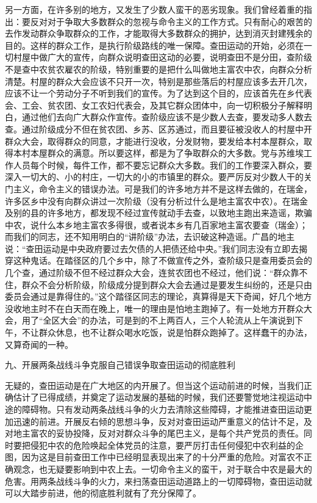 另一方面，在许多别的地方，又发生了少数人蛮干的恶劣现象。我们曾经着重的指出：要反对对于争取大多数群众的忽视与命令主义的工作方式。只有耐心的艰苦的去作发动群众争取群众的工作，才能取得大多数群众的拥护，达到消灭封建残余的目的。这样的群众工作，是执行阶级路线的唯一保障。查田运动的开始，必须在一切村屋中做广大的宣传，向群众说明查田这动的必要，说明查田不是分田，查阶级不是查中农贫农雇农的阶级，特别重要的是把什么叫做地主富农中农，向群众分析清楚。村屋的群众大会应该不只开一次，特别是那些落后的村屋应该多去开几次，应该不让一个劳动分子不听到我们的宣传。为了达到这个目的，应该首先在乡代表会、工会、贫农团、女工农妇代表会，及其它群众团体中，向一切积极分子解释明白，通过他们去向广大群众作宣传。查阶级应该不是少数人去查，要发动多人数去查。通过阶级成分不但在贫农团、乡苏、区苏通过，而且要征被没收人的村屋中开群众大会，取得群众的同意，才能进行没收，分发财物，要发给本村本屋群众，取得本村本屋群众的满意。所以要这样，都是为了争取群众的大多数。党与苏维埃工作人员每个时候，每件工作，都不要忘记群众大多数。我们的工作要深入群众，要深入一切大的、小的村庄，一切大的小的市镇里的群众。要严厉反对少数人干的关门主义，命令主义的错误办法。可是我们的许多地方并不是这样去做的，在瑞金，许多区乡中没有向群众讲过一次阶级（没有分析过什么是地主富农中农）。在瑞金及别的县的许多地方，都发现不经过宣传就动手去查，以致地主跑出来造谣，欺骗中农，说什么本乡地主富农多得很，或者说本乡有几百家地主富农要查（瑞金）；而我们的同志，还不知用明白的“讲阶级”办法，去识破这种造谣。广昌的地主说：“查田运动是中央政府要过去欠债的人把债还给中央。”我们同志没有立即去揭穿这种鬼话。在踏径区的几个乡中，除了不做宣传之外，查阶级只是查用委员会的几个查，通过阶级不但不经过群众大会，连贫农团也不经过，他们说：“群众靠不住，群众不会分析阶级，阶级成分提到群众大会去通过是要发生纠纷的，还是只由委员会通过是靠得住的。”这个踏径区同志的理论，真算得是天下奇闻，好几个地方没收地主时不在白天而在晚上，唯一的理由是怕地主跑掉了。有一处地方开群众大会，用了“全区大会”的办法，可是到的不上两百人，三个人轮流从上午演说到下午，不让群众休息，也不让群众喝水吃饭，说是怕群众跑掉了。这样蠢干的办法，又算奇闻的一种。

九、开展两条战线斗争克服自己错误争取查田运动的彻底胜利

无疑的，查田运动是在广大地区的内开展了。但当这个运动前进的时候，当我们正确估计了已得成绩，并奠定了运动发展的基础的时候，我们还要警觉地注视运动中途的障碍物。只有发动两条战线斗争的火力去清除这些障碍，才能推进查田运动更加迅速的前进。开展反右倾的思想斗争，反对对查田运动严重意义的估计不足，及对地主富农的妥协投降，反对对群众斗争的尾巴主义，是每个共产党员的责任。同时要把侵犯中农的危险唤起全体党员的注意，要严厉打击任何侵犯中农利益的企图，因为这是目前查田工作中已经明显表现出来了的十分严重的危险。对富农不正确观念，也无疑要影响到中农上去。一切命令主义的蛮干，对于联合中农是最大的危害。用两条战线斗争的火力，来扫荡查田运动道路上的一切障碍物，查田运动就可以大踏步前进，他的彻底胜利就有了充分保障了。

